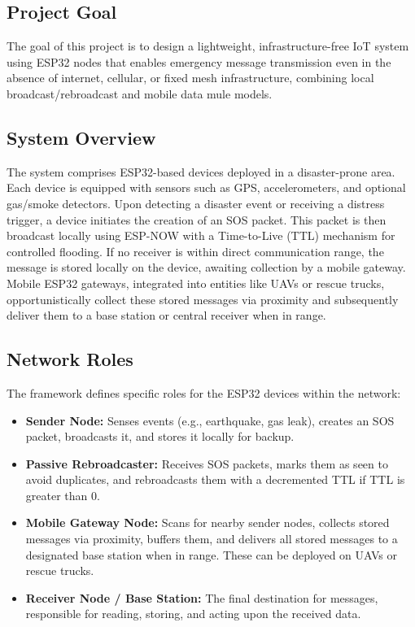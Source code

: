 \documentclass[12pt, a4paper]{article}
\begin{document}
\subsection{Project Goal}
The goal of this project is to design a lightweight, infrastructure-free IoT system using ESP32 nodes that enables emergency message transmission even in the absence of internet, cellular, or fixed mesh infrastructure, combining local broadcast/rebroadcast and mobile data mule models.

\subsection{System Overview}
The system comprises ESP32-based devices deployed in a disaster-prone area. Each device is equipped with sensors such as GPS, accelerometers, and optional gas/smoke detectors. Upon detecting a disaster event or receiving a distress trigger, a device initiates the creation of an SOS packet. This packet is then broadcast locally using ESP-NOW with a Time-to-Live (TTL) mechanism for controlled flooding. If no receiver is within direct communication range, the message is stored locally on the device, awaiting collection by a mobile gateway. Mobile ESP32 gateways, integrated into entities like UAVs or rescue trucks, opportunistically collect these stored messages via proximity and subsequently deliver them to a base station or central receiver when in range.

\subsection{Network Roles}
The framework defines specific roles for the ESP32 devices within the network:
\begin{itemize}
    \item \textbf{Sender Node:} Senses events (e.g., earthquake, gas leak), creates an SOS packet, broadcasts it, and stores it locally for backup.
    \item \textbf{Passive Rebroadcaster:} Receives SOS packets, marks them as seen to avoid duplicates, and rebroadcasts them with a decremented TTL if TTL is greater than 0.
    \item \textbf{Mobile Gateway Node:} Scans for nearby sender nodes, collects stored messages via proximity, buffers them, and delivers all stored messages to a designated base station when in range. These can be deployed on UAVs or rescue trucks.
    \item \textbf{Receiver Node / Base Station:} The final destination for messages, responsible for reading, storing, and acting upon the received data.
\end{itemize}
\end{document}
